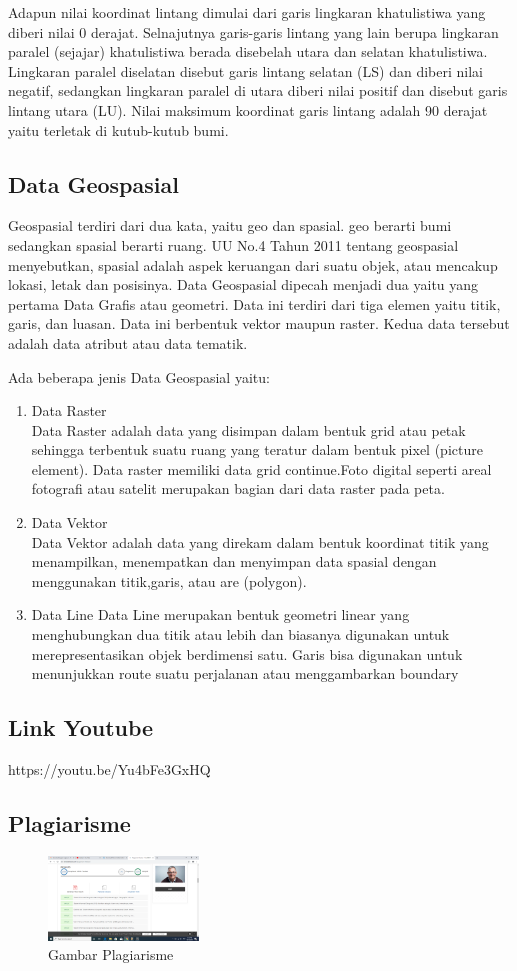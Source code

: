 Adapun nilai koordinat lintang dimulai dari garis lingkaran khatulistiwa yang diberi nilai 0 derajat. Selnajutnya garis-garis lintang yang lain berupa lingkaran paralel (sejajar) khatulistiwa berada disebelah utara dan selatan khatulistiwa. Lingkaran paralel diselatan disebut garis lintang selatan (LS) dan diberi nilai negatif, sedangkan lingkaran paralel di utara diberi nilai positif dan disebut garis lintang utara (LU). Nilai maksimum koordinat garis lintang adalah 90 derajat yaitu terletak di kutub-kutub bumi.

\subsection{Data Geospasial}
Geospasial terdiri dari dua kata, yaitu geo dan spasial. geo berarti bumi sedangkan spasial berarti ruang. UU No.4 Tahun 2011 tentang geospasial menyebutkan, spasial adalah aspek keruangan dari suatu objek, atau mencakup lokasi, letak dan posisinya. Data Geospasial dipecah menjadi dua yaitu yang pertama Data Grafis atau geometri. Data ini terdiri dari tiga elemen yaitu titik, garis, dan luasan. Data ini berbentuk vektor maupun raster. Kedua data tersebut adalah data atribut atau data tematik.

Ada beberapa jenis Data Geospasial yaitu:
\begin{enumerate}
\item Data Raster \\
Data Raster adalah data yang disimpan dalam bentuk grid atau petak sehingga terbentuk suatu ruang yang teratur dalam bentuk pixel (picture element). Data raster memiliki data grid continue.Foto digital seperti areal fotografi atau satelit merupakan bagian dari data raster pada peta.
\item Data Vektor \\
Data Vektor adalah data yang direkam dalam bentuk koordinat titik yang menampilkan, menempatkan dan menyimpan data spasial dengan menggunakan titik,garis, atau are (polygon).
\item Data Line
Data Line merupakan bentuk geometri linear yang menghubungkan dua titik atau lebih dan biasanya digunakan untuk merepresentasikan objek berdimensi satu. Garis bisa digunakan untuk menunjukkan route suatu perjalanan atau menggambarkan boundary

\end{enumerate}

\subsection{Link Youtube}
https://youtu.be/Yu4bFe3GxHQ

\subsection{Plagiarisme}
\begin{figure}[H]
	\includegraphics[width=4cm]{figures/Tugas1/1174054/plagiarismetgas1.png}
	\centering
	\caption{Gambar Plagiarisme}
\end{figure}